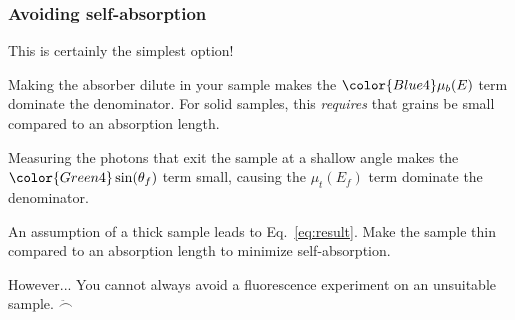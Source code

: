 \documentclass[10pt, xcolor=x11names, compress]{beamer}
\begin{document}
\begin{frame}
  \frametitle{Avoiding self-absorption}
  \begin{description}[Dilution]
  \item[Do transmission] This is certainly the simplest option!
  \item[Dilution] Making the absorber dilute in your sample makes the
    ${\color{Blue4}\mu_b(E)}$ term dominate the denominator. For solid
    samples, this \textit{requires} that grains be small compared to
    an absorption length.
  \item[Glancing exit angle] Measuring the photons that exit the
    sample at a shallow angle makes the $\color{Green4}\sin(\theta_f)$
    term small, causing the $\mu_t(E_f)$ term dominate the denominator.
  \item[Thin sample] An assumption of a thick sample leads to
    Eq.~\ref{eq:result}.  Make the sample thin compared to an
    absorption length to minimize self-absorption.
  \end{description}
  \begin{alertblock}{However...}
    You cannot always avoid a fluorescence experiment on an unsuitable
    sample. $\ddot\frown$
  \end{alertblock}
\end{frame}
\end{document}
